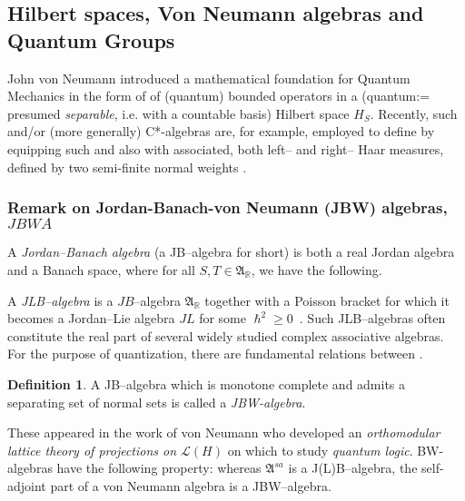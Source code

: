 \documentclass[12pt]{article}
\theoremstyle{plain}
\theoremstyle{definition}
\newtheorem{definition}{Definition}[section]
\numberwithin{equation}{section}
\newcommand{\bR}{\mathbb{R}}
\begin{document}
\subsection{Hilbert spaces, Von Neumann algebras and Quantum Groups}
 John von Neumann introduced a mathematical foundation for Quantum Mechanics in the form of  
of (quantum) bounded operators in a (quantum:= presumed \emph{separable}, i.e. with a countable basis) Hilbert space $H_S$. Recently, such 
 and/or (more generally) C*-algebras are, for example, employed to define 
 by equipping such 
and also with associated, both left-- and right-- Haar measures, defined by two semi-finite normal weights 
\cite{Vainerman2003}.

\subsubsection{Remark on Jordan-Banach-von Neumann (JBW) algebras, $JBWA$}
A \emph{Jordan--Banach algebra} (a JB--algebra for short) is both a real Jordan algebra and a
Banach space, where for all $S, T \in \mathfrak A_{\bR}$, we have the following.

A \emph{JLB--algebra} is a $JB$--algebra $\mathfrak A_{\bR}$ together with a Poisson bracket for 
which it becomes a Jordan--Lie algebra $JL$ for some $\hslash^2 \geq 0$~. Such JLB--algebras often 
constitute the real part of several widely studied complex associative algebras. 
For the purpose of quantization, there are fundamental relations between 
.
\bigbreak
\begin{definition}
A JB--algebra which is monotone complete and admits a separating set of normal sets is
called a \emph{JBW-algebra}.
\end{definition}

These appeared in the work of von Neumann who developed an \emph{orthomodular lattice theory of projections on $\mathcal L(H)$} on which to study \emph{quantum logic}. BW-algebras have the following property: whereas $\mathfrak A^{sa}$ is a J(L)B--algebra, the self-adjoint part of a von Neumann algebra is a JBW--algebra.
\end{document}
